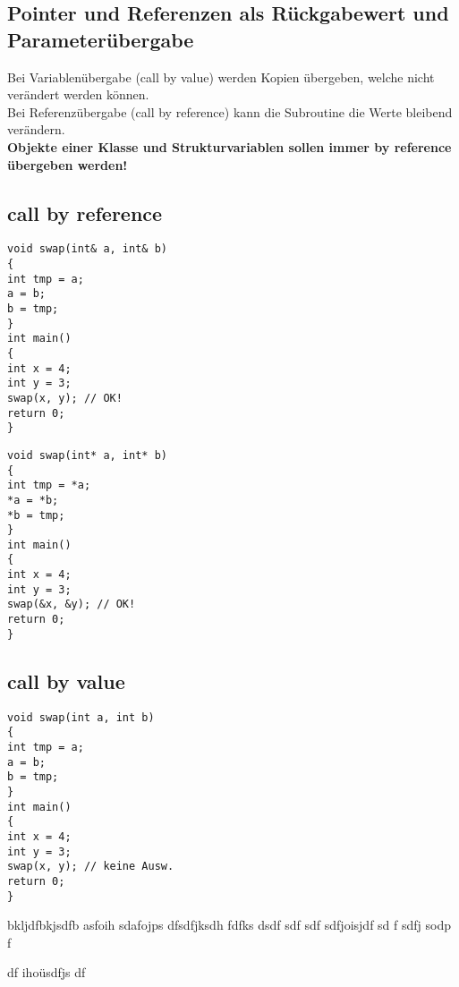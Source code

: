 \subsection{Pointer und Referenzen als Rückgabewert und Parameterübergabe}
  		Bei Variablenübergabe (call by value) werden Kopien übergeben, welche nicht verändert werden können.\\
  		Bei Referenzübergabe (call by reference) kann die Subroutine die Werte bleibend verändern. \\
  		\textbf{Objekte einer Klasse und Strukturvariablen sollen immer by reference übergeben werden!} \\
  		

\subsection{call by reference}
  \begin{minipage}[t]{5cm}
  \begin{lstlisting}
void swap(int& a, int& b)
{
int tmp = a;
a = b;
b = tmp;
}
int main()
{
int x = 4;
int y = 3;
swap(x, y); // OK!
return 0;
}	
\end{lstlisting}
\end{minipage}
\hspace*{0.5cm}
\begin{minipage}[t]{5cm}

\begin{lstlisting}
void swap(int* a, int* b)
{
int tmp = *a;
*a = *b;
*b = tmp;
}
int main()
{
int x = 4;
int y = 3;
swap(&x, &y); // OK!
return 0;
}
\end{lstlisting}
\end{minipage}
\begin{minipage}[t]{4.9 cm}
\subsection{call by value}
\begin{lstlisting}
void swap(int a, int b)
{
int tmp = a;
a = b;
b = tmp;
}
int main()
{
int x = 4;
int y = 3;
swap(x, y); // keine Ausw.
return 0;
}	
\end{lstlisting}
\end{minipage}

bkljdfbkjsdfb  asfoih sdafojps dfsdfjksdh fdfks dsdf sdf
sdf sdfjoisjdf sd f
sdfj sodp f 

df ihoüsdfjs
df


